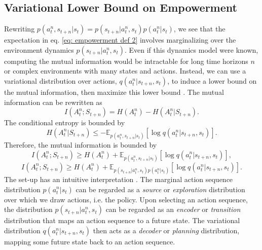 \subsection{Variational Lower Bound on Empowerment}
Rewriting $p(a^n_t , s_{t+n} | s_t) = p(s_{t+n} | a^n_t, s_t) p( a^n_t | s_t)$, we see that the expectation in eq. \ref{eq: empowerment def 2} involves marginalizing over the environment dynamics $p(s_{t+n} | a^n_t , s_t)$. Even if this dynamics model were known, computing the mutual information would be intractable for long time horizons $n$ or complex environments with many states and actions. Instead, we can use a variational distribution over actions, $q(a^n_t | s_{t+n}, s_t)$, to induce a lower bound on the mutual information, then maximize this lower bound \cite{barber2003algorithm}. The mutual information can be rewritten as
\begin{equation}
    I(A^n_t ; S_{t+n}) = H(A^n_t) - H(A^n_t | S_{t+n}).
\end{equation}
The conditional entropy is bounded by
\begin{equation}
    H(A^n_t | S_{t+n}) \leq - \mathbb{E}_{p(a^n_t , s_{t+n} | s_t)} \left[ \log q(a^n_t | s_{t+n}, s_t) \right].
\end{equation}
Therefore, the mutual information is bounded by
\begin{equation}
    I(A^n_t ; S_{t+n}) \geq H(A^n_t) + \mathbb{E}_{p(a^n_t , s_{t+n} | s_t)} \left[ \log q(a^n_t | s_{t+n}, s_t) \right],
\end{equation}
\begin{equation}
    I(A^n_t ; S_{t+n}) \geq H(A^n_t) + \mathbb{E}_{p(s_{t+n} | a^n_t , s_t) p(a^n_t | s_t)} \left[ \log q(a^n_t | s_{t+n}, s_t) \right].
\end{equation}
The set-up has an intuitive interpretation \cite{barber2003algorithm, mohamed2015variational}. The marginal action sequence distribution $p(a^n_t | s_t)$ can be regarded as a \textit{source} or \textit{exploration} distribution over which we draw actions, i.e. the policy. Upon selecting an action sequence, the distribution $p(s_{t+n} | a^n_t , s_t)$ can be regarded as an \textit{encoder} or \textit{transition} distribution that maps an action sequence to a future state. The variational distribution $q(a^n_t | s_{t+n}, s_t)$ then acts as a \textit{decoder} or \textit{planning} distribution, mapping some future state back to an action sequence.

